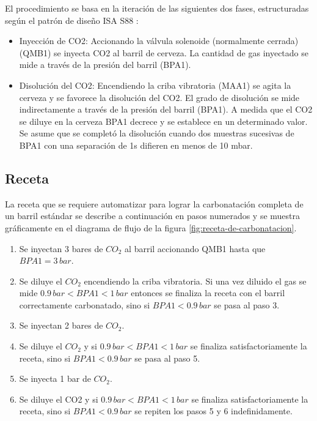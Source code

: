 El procedimiento se basa en la iteración de las siguientes dos fases, estructuradas según el patrón de diseño ISA S88 \cite{BRAN}:

\begin{itemize}
\item Inyección de CO2: Accionando la válvula solenoide (normalmente cerrada) (QMB1) se inyecta CO2 al barril de cerveza. La cantidad de gas inyectado se mide a través de la presión del barril (BPA1).
\item Disolución del CO2: Encendiendo la criba vibratoria (MAA1) se agita la cerveza y se favorece la disolución del CO2. El grado de disolución se mide indirectamente a través de la presión del barril (BPA1). A medida que el CO2 se diluye en la cerveza BPA1 decrece y se establece en un determinado valor. Se asume que se completó la disolución cuando dos muestras sucesivas de BPA1 con una separación de 1s difieren en menos de 10 mbar.
\end{itemize}

\subsection{Receta}
La receta que se requiere automatizar para lograr la carbonatación completa de un barril estándar se describe a continuación en pasos numerados y se muestra gráficamente en el diagrama de flujo de la figura \ref{fig:receta-de-carbonatacion}.

\begin{enumerate}
\item Se inyectan 3 bares de \(CO_{2}\) al barril accionando QMB1 hasta que \(BPA1 = 3\,bar\).
\item Se diluye el \(CO_{2}\) encendiendo la criba vibratoria. Si una vez diluido el gas se mide \(0.9\,bar < BPA1 < 1\,bar\) entonces se finaliza la receta con el barril correctamente carbonatado, sino si \(BPA1 < 0.9\,bar\) se pasa al paso 3.
\item Se inyectan 2 bares de \(CO_{2}\).
\item Se diluye el \(CO_{2}\) y si \(0.9\,bar < BPA1 < 1\,bar\) se finaliza satisfactoriamente la receta, sino si \(BPA1 < 0.9\,bar\) se pasa al paso 5.
\item Se inyecta 1 bar de \(CO_{2}\).
\item Se diluye el CO2 y si \(0.9\,bar < BPA1 < 1\,bar\) se finaliza satisfactoriamente la receta, sino si \(BPA1 < 0.9\,bar\) se repiten los pasos 5 y 6 indefinidamente.
\end{enumerate}

